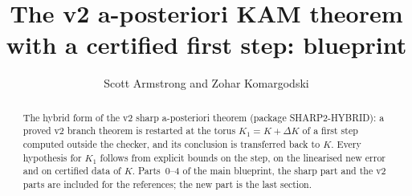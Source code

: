\documentclass[11pt]{amsart}
\title{The v2 a-posteriori KAM theorem with a certified first step: blueprint}
\author{Scott Armstrong and Zohar Komargodski}
\begin{document}
\begin{abstract}
The hybrid form of the v2 sharp a-posteriori theorem (package SHARP2-HYBRID): a proved v2 branch theorem is restarted at the
torus $K_1=K+\Delta K$ of a first step computed outside the checker, and its conclusion is transferred back to $K$. Every hypothesis
for $K_1$ follows from explicit bounds on the step, on the linearised new error and on certified data of $K$. Parts~0--4 of the main
blueprint, the sharp part and the v2 parts are included for the references; the new part is the last section.
\end{abstract}
\maketitle
\tableofcontents









\end{document}
